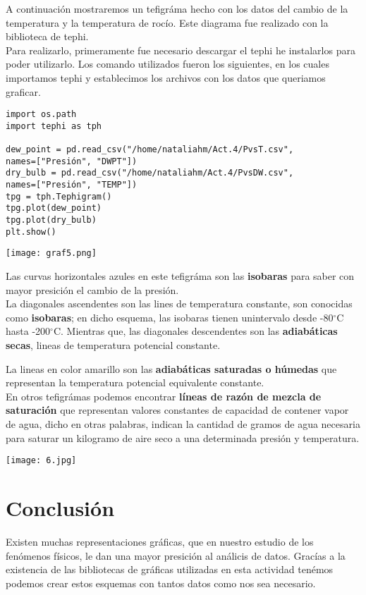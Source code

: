 \documentclass[11pt]{article}
\begin{document}
A continuación mostraremos un tefigráma hecho con los datos del cambio de la temperatura y la temperatura de rocío. Este diagrama fue realizado con la biblioteca de tephi.\\

Para realizarlo, primeramente fue necesario descargar el tephi he instalarlos para poder utilizarlo. Los comando utilizados fueron los siguientes, en los cuales importamos tephi y establecimos los archivos con los datos que queriamos graficar.\\


\begin{verbatim}
import os.path
import tephi as tph

dew_point = pd.read_csv("/home/nataliahm/Act.4/PvsT.csv", 
names=["Presión", "DWPT"])
dry_bulb = pd.read_csv("/home/nataliahm/Act.4/PvsDW.csv", 
names=["Presión", "TEMP"])
tpg = tph.Tephigram()
tpg.plot(dew_point)
tpg.plot(dry_bulb)
plt.show()
\end{verbatim}

\begin{center}
\texttt{[image: graf5.png]}
\end{center}

\large Las curvas horizontales azules en este tefigráma son las \textbf{isobaras} para saber con mayor presición el cambio de la presión.\\

La diagonales ascendentes son las lines de temperatura constante, son conocidas como \textbf{isobaras}; en dicho esquema, las isobaras tienen unintervalo desde -80$^{\circ}$C hasta -200$^{\circ}$C. Mientras que, las diagonales descendentes son las \textbf{adiabáticas secas}, lineas de temperatura potencial constante.

La lineas en color amarillo son las \textbf{adiabáticas saturadas o húmedas} que representan la temperatura potencial equivalente constante.\\

En otros tefigrámas podemos encontrar \textbf{líneas de razón de mezcla de saturación} que representan valores constantes de capacidad de contener vapor de agua, dicho en otras palabras, indican la cantidad de gramos de agua necesaria para saturar un kilogramo de aire seco a una determinada presión y temperatura. 

\begin{center}
\texttt{[image: 6.jpg]}
\end{center}


\section{\LARGE Conclusión}
Existen muchas representaciones gráficas, que en nuestro estudio de los fenómenos físicos, le dan una mayor presición al análicis de datos. Gracías a la existencia de las bibliotecas de gráficas utilizadas en esta actividad tenémos podemos crear estos esquemas con tantos datos como nos sea necesario.\\
\end{document}
